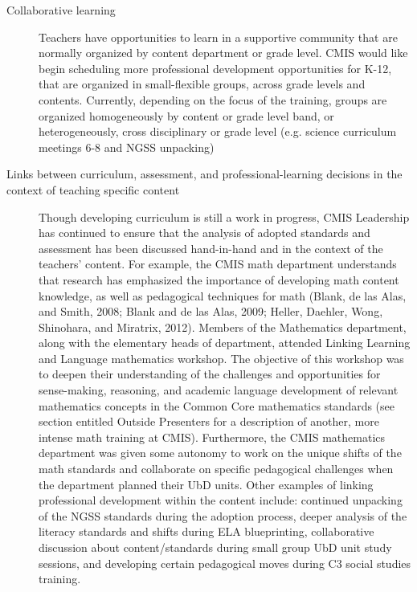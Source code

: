 \documentclass{report}
\begin{document}
\begin{findings}
\begin{description}
\item [Collaborative learning] Teachers have opportunities to learn in a supportive community that are normally organized by content department or grade level. CMIS would like begin scheduling more professional development opportunities for K-12, that are organized in small-flexible groups, across grade levels and contents. Currently, depending on the focus of the training, groups are organized homogeneously by content or grade level band, or heterogeneously, cross disciplinary or grade level (e.g. science curriculum meetings 6-8 and NGSS unpacking)
\item [Links between curriculum, assessment, and professional-learning decisions in the context of teaching specific content] Though developing curriculum is still a work in progress, CMIS Leadership has continued to ensure that the analysis of adopted standards and assessment has been discussed hand-in-hand and in the context of the teachers’ content. For example, the CMIS math department understands that research has emphasized the importance of developing math content knowledge, as well as pedagogical techniques for math (Blank, de las Alas, and Smith, 2008; Blank and de las Alas, 2009; Heller, Daehler, Wong, Shinohara, and Miratrix, 2012). Members of the Mathematics department, along with the elementary heads of department, attended Linking Learning and Language mathematics workshop. The objective of this workshop was to deepen their understanding of the challenges and opportunities for sense-making, reasoning, and academic language development of relevant  mathematics concepts in the Common Core mathematics standards (see section entitled Outside Presenters for a description of another, more intense math training at CMIS). Furthermore, the CMIS mathematics department was given some autonomy to work on the unique shifts of the math standards and collaborate on specific pedagogical challenges when the department planned their UbD units. Other examples of linking professional development within the content include: continued unpacking of the NGSS standards during the adoption process, deeper analysis of the literacy standards and shifts during ELA blueprinting, collaborative discussion about content/standards during small group UbD unit study sessions, and developing certain pedagogical moves during C3 social studies training. 

\end{description}
\end{findings}
\end{document}
